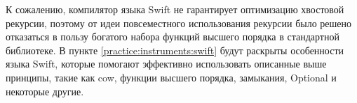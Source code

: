 К сожалению, компилятор языка Swift не гарантирует оптимизацию хвостовой рекурсии, поэтому от идеи повсеместного использования рекурсии было решено отказаться в пользу богатого набора функций высшего порядка в стандартной библиотеке. В пункте \ref{practice:instruments:swift} будут раскрыты особенности языка Swift, которые помогают эффективно использовать описанные выше принципы, такие как \gls{cow}, функции высшего порядка, замыкания, Optional и некоторые другие.